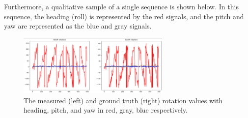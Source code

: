 Furthermore, a qualitative sample of a single sequence is shown below. In this sequence, the heading (roll) is represented by the red signals, and the pitch and yaw are represented as the blue and gray signals.

\begin{figure}[h] 
	\centering \includegraphics[height=3cm]{./images/rotations.png}
	\caption{The measured (left) and ground truth (right) rotation values with heading, pitch, and yaw in red, gray, blue respectively.}
\end{figure}


